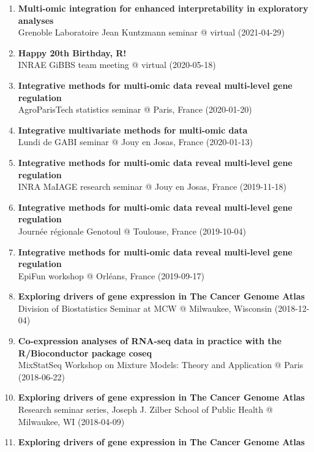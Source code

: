 \documentclass[11pt, a4paper]{awesome-cv}
\providecommand{\tightlist}{%
	\setlength{\itemsep}{0pt}\setlength{\parskip}{0pt}}
\begin{document}
\begin{enumerate}
\def\labelenumi{\arabic{enumi}.}
\tightlist
\item
  \textbf{Multi-omic integration for enhanced interpretability in
  exploratory analyses}\\
  Grenoble Laboratoire Jean Kuntzmann seminar @ virtual (2021-04-29)
\item
  \textbf{Happy 20th Birthday, R!}\\
  INRAE GiBBS team meeting @ virtual (2020-05-18)
\item
  \textbf{Integrative methods for multi-omic data reveal multi-level
  gene regulation}\\
  AgroParisTech statistics seminar @ Paris, France (2020-01-20)
\item
  \textbf{Integrative multivariate methods for multi-omic data}\\
  Lundi de GABI seminar @ Jouy en Josas, France (2020-01-13)
\item
  \textbf{Integrative methods for multi-omic data reveal multi-level
  gene regulation}\\
  INRA MaIAGE research seminar @ Jouy en Josas, France (2019-11-18)
\item
  \textbf{Integrative methods for multi-omic data reveal multi-level
  gene regulation}\\
  Journée régionale Genotoul @ Toulouse, France (2019-10-04)
\item
  \textbf{Integrative methods for multi-omic data reveal multi-level
  gene regulation}\\
  EpiFun workshop @ Orléans, France (2019-09-17)
\item
  \textbf{Exploring drivers of gene expression in The Cancer Genome
  Atlas}\\
  Division of Biostatistics Seminar at MCW @ Milwaukee, Wisconsin
  (2018-12-04)
\item
  \textbf{Co-expression analyses of RNA-seq data in practice with the
  R/Bioconductor package coseq}\\
  MixStatSeq Workshop on Mixture Models: Theory and Application @ Paris
  (2018-06-22)
\item
  \textbf{Exploring drivers of gene expression in The Cancer Genome
  Atlas}\\
  Research seminar series, Joseph J. Zilber School of Public Health @
  Milwaukee, WI (2018-04-09)
\item
  \textbf{Exploring drivers of gene expression in The Cancer Genome
  Atlas}\\

\end{enumerate}
\end{document}
